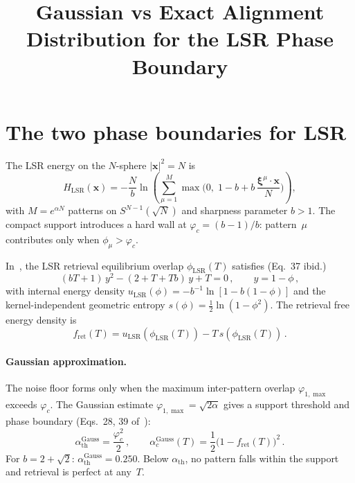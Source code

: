 \documentclass[11pt]{article}
\title{Gaussian vs Exact Alignment Distribution for the LSR Phase Boundary}
\author{}
\date{}
\newcommand{\bxi}{\boldsymbol{\xi}}
\newcommand{\bx}{\mathbf{x}}
\begin{document}
\maketitle

\section{The two phase boundaries for LSR}

The LSR energy on the $N$-sphere $|\bx|^2 = N$ is
\begin{equation}
H_{\mathrm{LSR}}(\bx) = -\frac{N}{b}\ln\left(\sum_{\mu=1}^{M}\max\!\Big(0,\;1 - b + b\,\frac{\bxi^\mu\!\cdot\!\bx}{N}\Big)\right),
\label{eq:lsr}
\end{equation}
with $M = e^{\alpha N}$ patterns on $S^{N-1}(\!\sqrt{N})$ and sharpness parameter $b > 1$.  The compact support introduces a hard wall at $\varphi_c = (b-1)/b$: pattern~$\mu$ contributes only when $\phi_\mu > \varphi_c$.

In~\citep{icml2026theory}, the LSR retrieval equilibrium overlap $\phi_{\mathrm{LSR}}(T)$ satisfies (Eq.~37 ibid.)
\begin{equation}
(bT+1)\,y^2 - (2+T+Tb)\,y + T = 0\,,\qquad y = 1-\phi\,,
\label{eq:phi_lsr}
\end{equation}
with internal energy density $u_{\mathrm{LSR}}(\phi) = -b^{-1}\ln[1-b(1-\phi)]$ and the kernel-independent geometric entropy $s(\phi) = \tfrac{1}{2}\ln(1-\phi^2)$.  The retrieval free energy density is
\begin{equation}
f_{\mathrm{ret}}(T) = u_{\mathrm{LSR}}(\phi_{\mathrm{LSR}}(T)) - T\,s(\phi_{\mathrm{LSR}}(T))\,.
\label{eq:f_ret_lsr}
\end{equation}

\paragraph{Gaussian approximation.}
The noise floor forms only when the maximum inter-pattern overlap $\varphi_{1,\max}$ exceeds $\varphi_c$.  The Gaussian estimate $\varphi_{1,\max} = \sqrt{2\alpha}$ gives a support threshold and phase boundary (Eqs.~28, 39 of~\citep{icml2026theory}):
\begin{equation}
\alpha_{\mathrm{th}}^{\mathrm{Gauss}} = \frac{\varphi_c^2}{2}\,,\qquad
\alpha_c^{\mathrm{Gauss}}(T) = \frac{1}{2}\big(1-f_{\mathrm{ret}}(T)\big)^2\,.
\label{eq:gauss_lsr}
\end{equation}
For $b = 2+\sqrt{2}$: $\alpha_{\mathrm{th}}^{\mathrm{Gauss}} = 0.250$.  Below $\alpha_{\mathrm{th}}$, no pattern falls within the support and retrieval is perfect at any~$T$.
\end{document}
